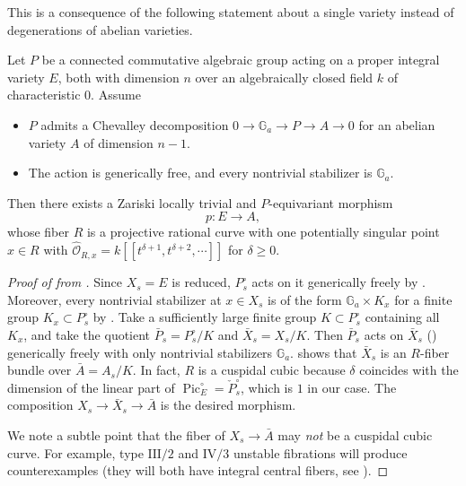 \documentclass[reqno, letterpaper]{amsart}
\numberwithin{equation}{subsection}
\let\to\longrightarrow
\newcommand{\GG}{\mathbb{G}}
\DeclareMathOperator{\Pic}{Pic}
\begin{document}
		This is a consequence of the following statement about a single variety instead of degenerations of abelian varieties.
		
		\begin{proposition} \label{prop:prop:Weierstrass fiber unstable}
			Let $P$ be a connected commutative algebraic group acting on a proper integral variety $E$, both with dimension $n$ over an algebraically closed field $k$ of characteristic $0$. Assume
			\begin{itemize}
				\item $P$ admits a Chevalley decomposition $0 \to \GG_a \to P \to A \to 0$ for an abelian variety $A$ of dimension $n-1$.
				\item The action is generically free, and every nontrivial stabilizer is $\GG_a$.
			\end{itemize}
			Then there exists a Zariski locally trivial and $P$-equivariant morphism
			\[ p : E \to A ,\]
			whose fiber $R$ is a projective rational curve with one potentially singular point $x \in R$ with $\hat {\mathcal O}_{R, x} = k[[t^{\delta+1}, t^{\delta+2}, \cdots]]$ for $\delta \ge 0$.
		\end{proposition}
		
		\begin{proof}[Proof of  from ]
			Since $X_s = E$ is reduced, $P^\circ_s$ acts on it generically freely by . Moreover, every nontrivial stabilizer at $x \in X_s$ is of the form $\GG_a \times K_x$ for a finite group $K_x \subset P^\circ_s$ by . Take a sufficiently large finite group $K \subset P^\circ_s$ containing all $K_x$, and take the quotient $\bar P_s = P^\circ_s / K$ and $\bar X_s = X_s / K$. Then $\bar P_s$ acts on $\bar X_s$ () generically freely with only nontrivial stabilizers $\GG_a$.  shows that $\bar X_s$ is an $R$-fiber bundle over $\bar A = A_s / K$. In fact, $R$ is a cuspidal cubic because $\delta$ coincides with the dimension of the linear part of $\Pic^\circ_E = \check P^\circ_s$, which is $1$ in our case. The composition $X_s \to \bar X_s \to \bar A$ is the desired morphism.
			
			We note a subtle point that the fiber of $X_s \to \bar A$ may \emph{not} be a cuspidal cubic curve. For example, type $\mathrm{III}/2$ and $\mathrm{IV}/3$ unstable fibrations will produce counterexamples (they will both have integral central fibers, see ).
		\end{proof}
		
\end{document}

